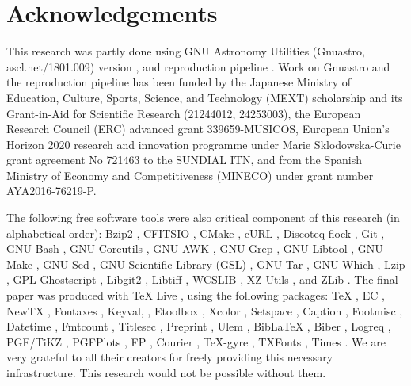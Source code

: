 \documentclass[10pt, twocolumn]{article}
\begin{document}
\section{Acknowledgements}

This research was partly done using GNU Astronomy Utilities (Gnuastro,
ascl.net/1801.009) version \gnuastroversion, and reproduction pipeline
\pipelineversion. Work on Gnuastro and the reproduction pipeline has been
funded by the Japanese Ministry of Education, Culture, Sports, Science, and
Technology (MEXT) scholarship and its Grant-in-Aid for Scientific Research
(21244012, 24253003), the European Research Council (ERC) advanced grant
339659-MUSICOS, European Union’s Horizon 2020 research and innovation
programme under Marie Sklodowska-Curie grant agreement No 721463 to the
SUNDIAL ITN, and from the Spanish Ministry of Economy and Competitiveness
(MINECO) under grant number AYA2016-76219-P.

The following free software tools were also critical component of this
research (in alphabetical order): Bzip2 \bziptwoversion, CFITSIO
\cfitsioversion, CMake \cmakeversion, cURL \curlversion, Discoteq flock
\flockversion, Git \gitversion, GNU Bash \bashversion, GNU Coreutils
\coreutilsversion, GNU AWK \gawkversion, GNU Grep \grepversion, GNU Libtool
\libtoolversion, GNU Make \makeversion, GNU Sed \sedversion, GNU Scientific
Library (GSL) \gslversion, GNU Tar \tarversion, GNU Which \whichversion,
Lzip \lzipversion, GPL Ghostscript \ghostscriptversion, Libgit2
\libgitwoversion, Libtiff \libtiffversion, WCSLIB \wcslibversion, XZ Utils
\xzversion, and ZLib \zlibversion. The final paper was produced with \TeX{}
Live \texliveversion, using the following packages: \TeX{} \textexversion,
EC \texecversion, NewTX \texnewtxversion, Fontaxes \texfontaxesversion,
Keyval, \texxkeyvalversion, Etoolbox \texetoolboxversion, Xcolor
\texxcolorversion, Setspace \texsetspaceversion, Caption
\texcaptionversion, Footmisc \texfootmiscversion, Datetime
\texdatetimeversion, Fmtcount \texfmtcountversion, Titlesec
\textitlesecversion, Preprint \texpreprintversion, Ulem \texulemversion,
Bib\LaTeX{} \texbiblatexversion, Biber \texbiberversion, Logreq
\texlogreqversion, PGF/TiKZ \texpgfversion, PGFPlots \texpgfplotsversion,
FP \texfpversion, Courier \texcourierversion, \TeX-gyre \textexgyreversion,
TXFonts \textxfontsversion, Times \textimesversion. We are very grateful to
all their creators for freely providing this necessary infrastructure. This
research would not be possible without them.

\printbibliography

\end{document}
